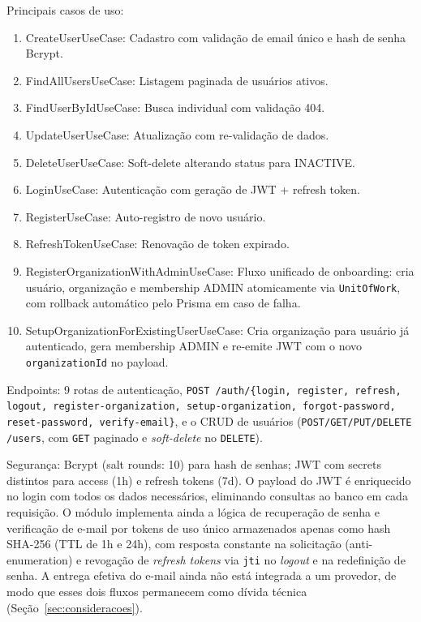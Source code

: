 Principais casos de uso:
\begin{enumerate}
\item CreateUserUseCase: Cadastro com validação de email único e hash de senha Bcrypt.
\item FindAllUsersUseCase: Listagem paginada de usuários ativos.
\item FindUserByIdUseCase: Busca individual com validação 404.
\item UpdateUserUseCase: Atualização com re-validação de dados.
\item DeleteUserUseCase: Soft-delete alterando status para INACTIVE.
\item LoginUseCase: Autenticação com geração de JWT + refresh token.
\item RegisterUseCase: Auto-registro de novo usuário.
\item RefreshTokenUseCase: Renovação de token expirado.
\item RegisterOrganizationWithAdminUseCase: Fluxo unificado de onboarding: cria usuário, organização e membership ADMIN atomicamente via \texttt{UnitOfWork}, com rollback automático pelo Prisma em caso de falha.
\item SetupOrganizationForExistingUserUseCase: Cria organização para usuário já autenticado, gera membership ADMIN e re-emite JWT com o novo \texttt{organizationId} no payload.
\end{enumerate}

Endpoints: 9 rotas de autenticação, \texttt{POST /auth/\{login, register, refresh, logout, register-organization, setup-organization, forgot-password, reset-password, verify-email\}}, e o CRUD de usuários (\texttt{POST/GET/PUT/DELETE /users}, com \texttt{GET} paginado e \textit{soft-delete} no \texttt{DELETE}).

Segurança: Bcrypt (salt rounds: 10) para hash de senhas; JWT com secrets distintos para access (1h) e refresh tokens (7d). O payload do JWT é enriquecido no login com todos os dados necessários, eliminando consultas ao banco em cada requisição. O módulo implementa ainda a lógica de recuperação de senha e verificação de e-mail por tokens de uso único armazenados apenas como hash SHA-256 (TTL de 1h e 24h), com resposta constante na solicitação (anti-enumeration) e revogação de \textit{refresh tokens} via \texttt{jti} no \textit{logout} e na redefinição de senha. A entrega efetiva do e-mail ainda não está integrada a um provedor, de modo que esses dois fluxos permanecem como dívida técnica (Seção~\ref{sec:consideracoes}).

